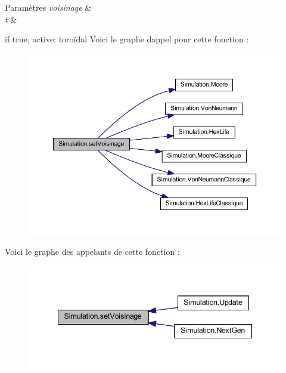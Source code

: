 \begin{DoxyParams}{Paramètres}
{\em voisinage} & \\
\hline
{\em t} & \\
\hline
\end{DoxyParams}
if true, active\+: toroïdal Voici le graphe d\textquotesingle{}appel pour cette fonction \+:\nopagebreak
\begin{figure}[H]
\begin{center}
\leavevmode
\includegraphics[width=350pt]{class_simulation_a9238f4dcd56a4945017fda48a76a3dc8_cgraph}
\end{center}
\end{figure}
Voici le graphe des appelants de cette fonction \+:\nopagebreak
\begin{figure}[H]
\begin{center}
\leavevmode
\includegraphics[width=342pt]{class_simulation_a9238f4dcd56a4945017fda48a76a3dc8_icgraph}
\end{center}
\end{figure}
\mbox{\label{class_simulation_af5fd57d6f657f07bc0fac7085832dc82}} 
